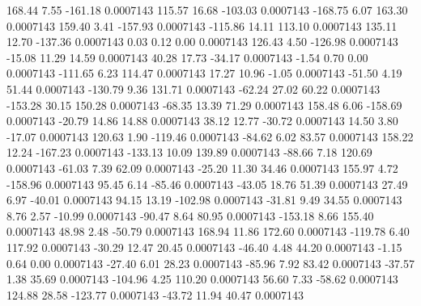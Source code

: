       168.44        7.55     -161.18     0.0007143
      115.57       16.68     -103.03     0.0007143
     -168.75        6.07      163.30     0.0007143
      159.40        3.41     -157.93     0.0007143
     -115.86       14.11      113.10     0.0007143
      135.11       12.70     -137.36     0.0007143
        0.03        0.12        0.00     0.0007143
      126.43        4.50     -126.98     0.0007143
      -15.08       11.29       14.59     0.0007143
       40.28       17.73      -34.17     0.0007143
       -1.54        0.70        0.00     0.0007143
     -111.65        6.23      114.47     0.0007143
       17.27       10.96       -1.05     0.0007143
      -51.50        4.19       51.44     0.0007143
     -130.79        9.36      131.71     0.0007143
      -62.24       27.02       60.22     0.0007143
     -153.28       30.15      150.28     0.0007143
      -68.35       13.39       71.29     0.0007143
      158.48        6.06     -158.69     0.0007143
      -20.79       14.86       14.88     0.0007143
       38.12       12.77      -30.72     0.0007143
       14.50        3.80      -17.07     0.0007143
      120.63        1.90     -119.46     0.0007143
      -84.62        6.02       83.57     0.0007143
      158.22       12.24     -167.23     0.0007143
     -133.13       10.09      139.89     0.0007143
      -88.66        7.18      120.69     0.0007143
      -61.03        7.39       62.09     0.0007143
      -25.20       11.30       34.46     0.0007143
      155.97        4.72     -158.96     0.0007143
       95.45        6.14      -85.46     0.0007143
      -43.05       18.76       51.39     0.0007143
       27.49        6.97      -40.01     0.0007143
       94.15       13.19     -102.98     0.0007143
      -31.81        9.49       34.55     0.0007143
        8.76        2.57      -10.99     0.0007143
      -90.47        8.64       80.95     0.0007143
     -153.18        8.66      155.40     0.0007143
       48.98        2.48      -50.79     0.0007143
      168.94       11.86      172.60     0.0007143
     -119.78        6.40      117.92     0.0007143
      -30.29       12.47       20.45     0.0007143
      -46.40        4.48       44.20     0.0007143
       -1.15        0.64        0.00     0.0007143
      -27.40        6.01       28.23     0.0007143
      -85.96        7.92       83.42     0.0007143
      -37.57        1.38       35.69     0.0007143
     -104.96        4.25      110.20     0.0007143
       56.60        7.33      -58.62     0.0007143
      124.88       28.58     -123.77     0.0007143
      -43.72       11.94       40.47     0.0007143

